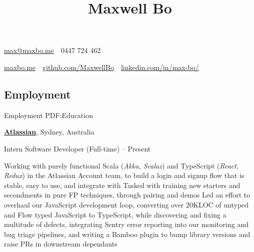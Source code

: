 \documentclass[a4paper,10pt,oneside]{article}
\begin{document}
\begin{minipage}[t][0pt]{\linewidth}


\title{Maxwell Bo}

\begin{subtitle}
\par \href{mailto:max@maxbo.me}{max@maxbo.me} \,\BulletSymbol\, 0447 724 462

\par \href{http://maxbo.me/}{maxbo.me} 
\,\BulletSymbol\, 
\href{https://github.com/MaxwellBo}{github.com/MaxwellBo}
\,\BulletSymbol\, 
\href{https://www.linkedin.com/in/max-bo/}{linkedin.com/in/max-bo/}

\end{subtitle}

\begin{body}


\section
{Employment}
{Employment}
{PDF:Education}

\href{https://www.atlassian.com/}{\textbf{Atlassian}}, Sydney, Australia
\par Intern Software Developer (Full-time)\hfill {} -- Present
\begin{detail}
	\BulletItem Working with purely functional Scala (\textit{Akka, Scalaz}) and TypeScript (\textit{React, Redux}) in the Atlassian Account team, to build a login and signup flow that is stable, easy to use, and integrate with
	\BulletItem Tasked with training new starters and secondments in pure FP techniques, through pairing and demos
	\BulletItem Led an effort to overhaul our JavaScript development loop, converting over 20KLOC of untyped and Flow typed JavaScript to TypeScript, while discovering and fixing a multitude of defects, integrating Sentry error reporting into our monitoring and bug triage pipelines, and writing a Bamboo plugin to bump library versions and raise PRs in downstream dependants
\end{detail}

\EntryGap


\end{body}
\end{minipage}
\end{document}
